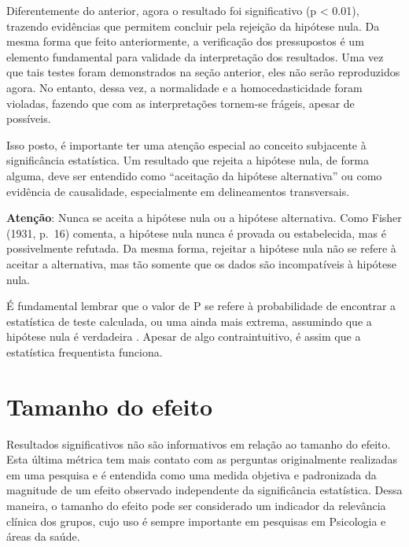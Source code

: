 \documentclass[
]{book}
\begin{document}
Diferentemente do anterior, agora o resultado foi significativo (p \textless{} 0.01), trazendo evidências que permitem concluir pela rejeição da hipótese nula. Da mesma forma que feito anteriormente, a verificação dos pressupostos é um elemento fundamental para validade da interpretação dos resultados. Uma vez que tais testes foram demonstrados na seção anterior, eles não serão reproduzidos agora. No entanto, dessa vez, a normalidade e a homocedasticidade foram violadas, fazendo que com as interpretações tornem-se frágeis, apesar de possíveis.

Isso posto, é importante ter uma atenção especial ao conceito subjacente à significância estatística. Um resultado que rejeita a hipótese nula, de forma alguma, deve ser entendido como ``aceitação da hipótese alternativa'' ou como evidência de causalidade, especialmente em delineamentos transversais.

\begin{warning}

\textbf{Atenção}: Nunca se aceita a hipótese nula ou a hipótese alternativa. Como Fisher (1931, p.~16) comenta, a hipótese nula nunca é provada ou estabelecida, mas é possivelmente refutada. Da mesma forma, rejeitar a hipótese nula não se refere à aceitar a alternativa, mas tão somente que os dados são incompatíveis à hipótese nula.

\end{warning}

É fundamental lembrar que o valor de P se refere à probabilidade de encontrar a estatística de teste calculada, ou uma ainda mais extrema, assumindo que a hipótese nula é verdadeira \citep{Wasserstein2016}. Apesar de algo contraintuitivo, é assim que a estatística frequentista funciona.

\hypertarget{tamanho-do-efeito-1}{%
\section{Tamanho do efeito}\label{tamanho-do-efeito-1}}

Resultados significativos não são informativos em relação ao tamanho do efeito. Esta última métrica tem mais contato com as perguntas originalmente realizadas em uma pesquisa e é entendida como uma medida objetiva e padronizada da magnitude de um efeito observado independente da significância estatística. Dessa maneira, o tamanho do efeito pode ser considerado um indicador da relevância clínica dos grupos, cujo uso é sempre importante em pesquisas em Psicologia e áreas da saúde.
\end{document}
